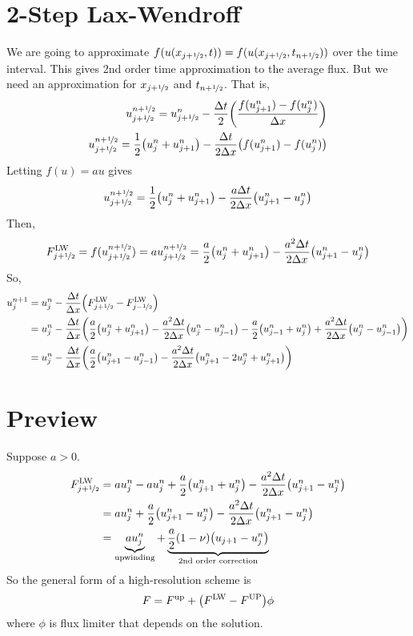 \documentclass{article}
\newcommand{\half}{\nicefrac{1}{2}}
\newcommand{\Dx}{\Delta x}
\newcommand{\Dt}{\Delta t}
\begin{document}
    \section{2-Step Lax-Wendroff}
        We are going to approximate $f(u(x_{j+\half},t)) = f(u(x_{j+\half},t_{n+\half}))$ over the time interval.  This gives 2nd order time approximation to the average flux.  But we need an approximation for $x_{j+\half}$ and $t_{n+\half}$.  That is,
        \begin{align*}
            u_{j+\half}^{n+\half} = u_{j+\half}^n - \frac{\Dt}{2}\qty(\frac{f(u_{j+1}^n) - f(u_j^n)}{\Dx}) \\
            u_{j+\half}^{n+\half} = \frac{1}{2}\qty(u_j^n + u_{j+1}^n) - \frac{\Dt}{2\Dx}\qty(f(u_{j+1}^n) - f(u_j^n))
        \end{align*}
        Letting $f(u) = au$ gives
        \begin{align*}
            u_{j+\half}^{n+\half} = \frac{1}{2}\qty(u_j^n + u_{j+1}^n) - \frac{a\Dt}{2\Dx}\qty(u_{j+1}^n - u_j^n)
        \end{align*}
        Then,
        \begin{align*}
            F_{j+\half}^\text{LW} = f(u_{j+\half}^{n+\half}) = au_{j+\half}^{n+\half} = \frac{a}{2}\qty(u_j^n + u_{j+1}^n) - \frac{a^2\Dt}{2\Dx}\qty(u_{j+1}^n - u_j^n)
        \end{align*}
        So,
        \begin{align*}
            u_j^{n+1} &= u_j^n - \frac{\Dt}{\Dx}\qty(F_{j+\half}^\text{LW} - F_{j-\half}^\text{LW}) \\
            &= u_j^n - \frac{\Dt}{\Dx}\qty(\frac{a}{2}\qty(u_j^n + u_{j+1}^n) - \frac{a^2\Dt}{2\Dx}\qty(u_{j}^n - u_{j-1}^n) - \frac{a}{2}\qty(u_{j-1}^n + u_j^n) + \frac{a^2\Dt}{2\Dx}\qty(u_j^n - u_{j-1}^n)) \\
            &= u_j^n - \frac{\Dt}{\Dx}\qty(\frac{a}{2}\qty(u_{j+1}^n - u_{j-1}^n) - \frac{a^2\Dt}{2\Dx}\qty(u_{j+1}^n - 2u_j^n + u_{j+1}^n))
        \end{align*}

    \section{Preview}

        Suppose $a > 0$.
        \begin{align*}
            F_{j+\half}^\text{LW} &= au_j^n - au_j^n + \frac{a}{2}\qty(u_{j+1}^n + u_j^n) - \frac{a^2\Dt}{2\Dx}\qty(u_{j+1}^n - u_j^n) \\
            &= au_j^n + \frac{a}{2}\qty(u_{j+1}^n - u_j^n) - \frac{a^2\Dt}{2\Dx}\qty(u_{j+1}^n - u_j^n) \\
            &= \underbrace{au_j^n}_\text{upwinding} + \underbrace{\frac{a}{2}\qty(1 - \nu)\qty(u_{j+1} - u_j^n)}_\text{2nd order correction}
        \end{align*}
        So the general form of a high-resolution scheme is
        \begin{align*}
            F = F^\text{up} + \qty(F^\text{LW} - F^\text{UP})\phi
        \end{align*}
        where $\phi$ is flux limiter that depends on the solution.
\end{document}
